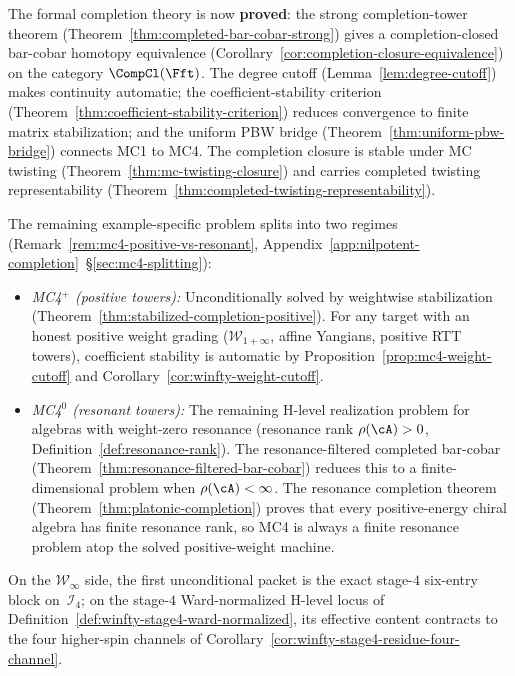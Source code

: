 \begin{remark}\label{rem:mc4-reduction-chain}
The formal completion theory is now \textbf{proved}: the strong
completion-tower theorem
(Theorem~\ref{thm:completed-bar-cobar-strong}) gives a
completion-closed bar-cobar homotopy equivalence
(Corollary~\ref{cor:completion-closure-equivalence}) on the category
$\CompCl(\Fft)$. The degree cutoff
(Lemma~\ref{lem:degree-cutoff}) makes continuity automatic; the
coefficient-stability criterion
(Theorem~\ref{thm:coefficient-stability-criterion}) reduces
convergence to finite matrix stabilization; and the uniform PBW
bridge (Theorem~\ref{thm:uniform-pbw-bridge}) connects MC1 to MC4.
The completion closure is stable under MC twisting
(Theorem~\ref{thm:mc-twisting-closure}) and carries completed
twisting representability
(Theorem~\ref{thm:completed-twisting-representability}).

The remaining example-specific problem splits into two regimes
(Remark~\ref{rem:mc4-positive-vs-resonant},
Appendix~\ref{app:nilpotent-completion}~\S\ref{sec:mc4-splitting}):
\begin{itemize}
\item \emph{MC4$^+$ (positive towers):}
 Unconditionally solved by weightwise stabilization
 (Theorem~\ref{thm:stabilized-completion-positive}). For any target
 with an honest positive weight grading ($\mathcal{W}_{1+\infty}$,
 affine Yangians, positive RTT towers), coefficient stability is
 automatic by Proposition~\ref{prop:mc4-weight-cutoff} and
 Corollary~\ref{cor:winfty-weight-cutoff}.
\item \emph{MC4$^0$ (resonant towers):}
 The remaining H-level realization problem for algebras with
 weight-zero resonance
 (resonance rank $\rho(\cA) > 0$,
 Definition~\ref{def:resonance-rank}). The
 resonance-filtered completed bar-cobar
 (Theorem~\ref{thm:resonance-filtered-bar-cobar}) reduces this to a
 finite-dimensional problem when $\rho(\cA) < \infty$. The resonance
 completion theorem
 (Theorem~\ref{thm:platonic-completion}) proves that every
 positive-energy chiral algebra has finite resonance rank, so MC4
 is always a finite resonance problem atop the solved
 positive-weight machine.
\end{itemize}

On the $\mathcal{W}_\infty$ side, the first unconditional packet is
the exact stage-$4$ six-entry block on~$\mathcal{I}_4$; on the
stage-$4$ Ward-normalized H-level locus of
Definition~\ref{def:winfty-stage4-ward-normalized}, its effective content
contracts to the four higher-spin channels of
Corollary~\ref{cor:winfty-stage4-residue-four-channel}.


\end{remark}
